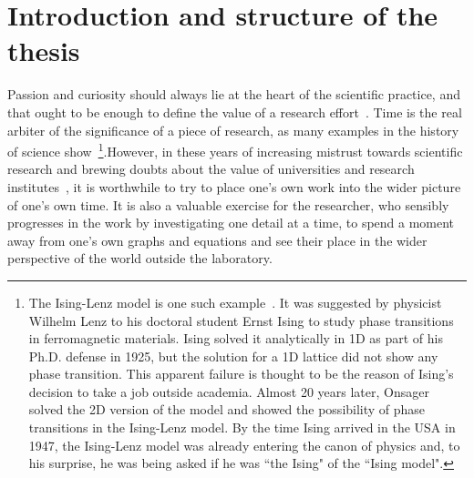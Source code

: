 \section{Introduction and structure of the thesis}

Passion and curiosity should always lie at the heart of the scientific practice, and that ought to be enough to define the value of a research effort~\cite{Weber1917,Shapin2015}. Time is the real arbiter of the significance of a piece of research, as many examples in the history of science show~\cite{Brush1967,Niss2008}\footnote{The Ising-Lenz model is one such example~\cite{Brush1967,Niss2008,Niss2004}. It was suggested by physicist Wilhelm Lenz to his doctoral student Ernst Ising to study phase transitions in ferromagnetic materials. Ising solved it analytically in 1D as part of his Ph.D. defense in 1925, but the solution for a 1D lattice did not show any phase transition. This apparent failure is thought to be the reason of Ising's decision to take a job outside academia. Almost 20 years later, Onsager solved the 2D version of the model and showed the possibility of phase transitions in the Ising-Lenz model. By the time Ising arrived in the USA in 1947, the Ising-Lenz model was already entering the canon of physics and, to his surprise, he was being asked if he was ``the Ising" of the ``Ising model".}.However, in these years of increasing mistrust towards scientific research and brewing doubts about the value of universities and research institutes~\cite{Biesta2002,Biesta2004,Santos2012}, it is worthwhile to try to place one's own work into the wider picture of one's own time. It is also a valuable exercise for the researcher, who sensibly progresses in the work by investigating one detail at a time, to spend a moment away from one's own graphs and equations and see their place in the wider perspective of the world outside the laboratory.\\
